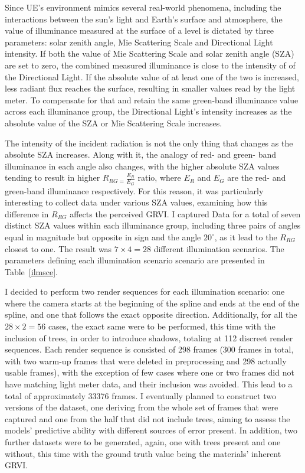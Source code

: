 Since UE's environment mimics several real-world phenomena, including the interactions between the sun's light and Earth's surface and atmosphere, the value of illuminance measured at the surface of a level is dictated by three parameters: solar zenith angle, Mie Scattering Scale and Directional Light intensity. If both the value of Mie Scattering Scale and solar zenith angle (SZA) are set to zero, the combined measured illuminance is close to the intensity of of the Directional Light. If the absolute value of at least one of the two is increased, less radiant flux reaches the surface, resulting in smaller values read by the light meter. To compensate for that and retain the same green-band illuminance value across each illuminance group, the Directional Light's intensity increases as the absolute value of the SZA or Mie Scattering Scale increases. 

The intensity of the incident radiation is not the only thing that changes as the absolute SZA increases. Along with it, the analogy of red- and green- band illuminance in each angle also changes, with the higher absolute SZA values tending to result in higher $R_{RG = }\frac{E_R}{E_G}$ ratio, where $E_R$ and $E_G$ are the red- and green-band illuminance respectively. For this reason, it was particularly interesting to collect data under various SZA values, examining how this difference in $R_{RG}$ affects the perceived GRVI. I captured Data for a total of seven distinct SZA values within each illuminance group, including three pairs of angles equal in magnitude but opposite in sign and the angle $20^\circ$, as it lead to the $R_{RG}$ closest to one. The result was $7 \times 4 = 28$ different illumination scenarios. The parameters defining each illumination scenario scenario are presented in Table~\ref{ilmsce}.

I decided to perform two render sequences for each illumination scenario: one where the camera starts at the beginning of the spline and ends at the end of the spline, and one that follows the exact opposite direction. Additionally, for all the $28 \times 2 = 56$ cases, the exact same were to be performed, this time with the inclusion of trees, in order to introduce shadows, totaling at 112 discreet render sequences. Each render sequence is consisted of 298 frames (300 frames in total, with two warm-up frames that were deleted in preprocessing and 298 actually usable frames), with the exception of few cases where one or two frames did not have matching light meter data, and their inclusion was avoided. This lead to a total of approximately 33376 frames. I eventually planned to construct two versions of the dataset, one deriving from the whole set of frames that were captured and one from the half that did not include trees, aiming to assess the models' predictive ability with different sources of error present. In addition, two further datasets were to be generated, again, one with trees present and one without, this time with the ground truth value being the materials' inherent GRVI.

